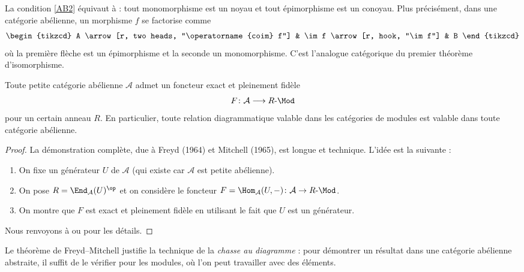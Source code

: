 \begin{remarque}\label{rem:abelian-reformulation}
La condition \ref{AB2} équivaut à : tout monomorphisme est un noyau et tout
épimorphisme est un conoyau. Plus précisément, dans une catégorie
abélienne, un morphisme $f$ se factorise comme
\[
\begin{tikzcd}
A \arrow[r, two heads, "\operatorname{coim} f"]
& \im f \arrow[r, hook, "\im f"]
& B
\end{tikzcd}
\]
où la première flèche est un épimorphisme et la seconde un monomorphisme.
C'est l'analogue catégorique du premier théorème d'isomorphisme.
\end{remarque}

\begin{theoreme}%
\label{thm:freyd-mitchell}
Toute petite catégorie abélienne $\mathcal{A}$ admet un foncteur
exact et pleinement fidèle
\[
  F \colon \mathcal{A} \longrightarrow R\text{-}\Mod
\]
pour un certain anneau $R$. En particulier, toute relation
diagrammatique valable dans les catégories
de modules est valable dans toute catégorie abélienne.
\end{theoreme}

\begin{proof}
La démonstration complète, due à Freyd (1964) et Mitchell (1965),
est longue et technique. L'idée est la suivante :
\begin{enumerate}[label=\arabic*.]
\item On fixe un générateur $U$ de $\mathcal{A}$
  (qui existe car $\mathcal{A}$ est petite abélienne).
\item On pose $R = \End_{\mathcal{A}}(U)^{\op}$ et on considère le
  foncteur $F = \Hom_{\mathcal{A}}(U, -) \colon \mathcal{A} \to R\text{-}\Mod$.
\item On montre que $F$ est exact et pleinement fidèle en utilisant
  le fait que $U$ est un générateur.
\end{enumerate}
Nous renvoyons à \cite{freyd1964} ou \cite{mitchell1965} pour les
détails.
\end{proof}

\begin{remarque}\label{rem:freyd-mitchell-usage}
Le théorème de Freyd--Mitchell
justifie la technique de la \emph{chasse au diagramme} :
pour démontrer un résultat dans une catégorie abélienne abstraite,
il suffit de le vérifier pour les modules, où l'on peut travailler
avec des éléments.
\end{remarque}



